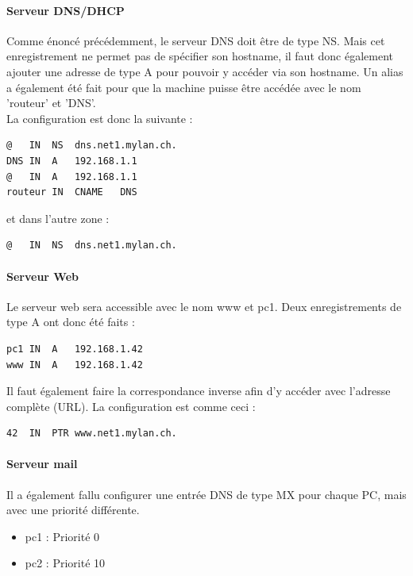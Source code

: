 \documentclass{article}
\begin{document}
\paragraph{Serveur DNS/DHCP}

Comme énoncé précédemment, le serveur DNS doit être de type NS. Mais cet enregistrement ne permet pas de spécifier son hostname, il faut donc également ajouter une adresse de type A pour pouvoir y accéder via son hostname. Un alias a également été fait pour que la machine puisse être accédée avec le nom 'routeur' et 'DNS'.\\

La configuration est donc la suivante : 

\begin{lstlisting}
@	IN	NS	dns.net1.mylan.ch.
DNS	IN	A	192.168.1.1
@	IN	A	192.168.1.1
routeur	IN	CNAME	DNS
\end{lstlisting}

et dans l'autre zone :

\begin{lstlisting}
@	IN 	NS	dns.net1.mylan.ch.
\end{lstlisting}

\paragraph{Serveur Web}

Le serveur web sera accessible avec le nom www et pc1. Deux enregistrements de type A ont donc été faits : \\

\begin{lstlisting}
pc1	IN	A	192.168.1.42
www	IN	A	192.168.1.42
\end{lstlisting}

Il faut également faire la correspondance inverse afin d'y accéder avec l'adresse complète (URL). La configuration est comme ceci : 

\begin{lstlisting}
42	IN	PTR	www.net1.mylan.ch.
\end{lstlisting}

\paragraph{Serveur mail}

Il a également fallu configurer une entrée DNS de type MX pour chaque PC, mais avec une priorité différente.

\begin{itemize}
	\item pc1 : Priorité 0
	\item pc2 : Priorité 10
\end{itemize}
\end{document}
